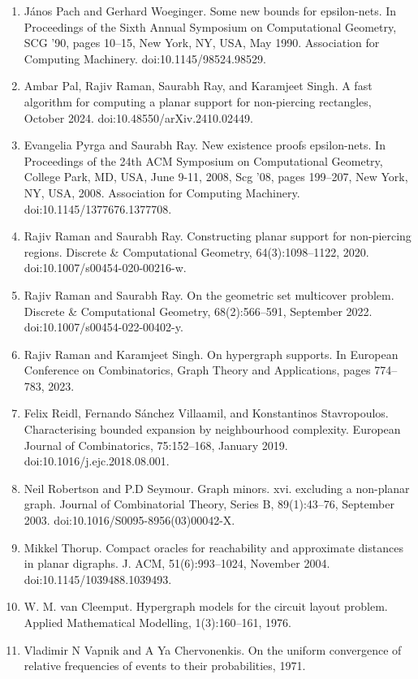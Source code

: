 \documentclass[10pt,a4paper]{article}
\begin{document}
\begin{enumerate}
\item[]  [51]  János Pach and Gerhard Woeginger.  Some new bounds for epsilon-nets.  In Proceedings of the Sixth Annual Symposium on Computational Geometry, SCG ’90, pages 10–15, New York, NY, USA, May 1990. Association for Computing Machinery.  doi:10.1145/98524.98529.  
\item[]  [52]  Ambar Pal, Rajiv Raman, Saurabh Ray, and Karamjeet Singh.  A fast algorithm for computing a planar support for non-piercing rectangles, October 2024.  doi:10.48550/arXiv.2410.02449.  
\item[]  [53]  Evangelia Pyrga and Saurabh Ray.  New existence proofs epsilon-nets.  In Proceedings of the 24th ACM Symposium on Computational Geometry, College Park, MD, USA, June 9-11, 2008, Scg ’08, pages 199–207, New York, NY, USA, 2008. Association for Computing Machinery.  doi:10.1145/1377676.1377708.  
\item[]  [54]  Rajiv Raman and Saurabh Ray.  Constructing planar support for non-piercing regions.  Discrete \& Computational Geometry, 64(3):1098–1122, 2020.  doi:10.1007/s00454-020-00216-w.  
\item[]  [55]  Rajiv Raman and Saurabh Ray.  On the geometric set multicover problem.  Discrete \& Computational Geometry, 68(2):566–591, September 2022.  doi:10.1007/s00454-022-00402-y.  
\item[]  [56]  Rajiv Raman and Karamjeet Singh.  On hypergraph supports.  In European Conference on Combinatorics, Graph Theory and Applications, pages 774–783, 2023.  
\item[]  [57]  Felix Reidl, Fernando Sánchez Villaamil, and Konstantinos Stavropoulos.  Characterising bounded expansion by neighbourhood complexity.  European Journal of Combinatorics, 75:152–168, January 2019.  doi:10.1016/j.ejc.2018.08.001.  
\item[]  [58]  Neil Robertson and P.D Seymour.  Graph minors. xvi. excluding a non-planar graph.  Journal of Combinatorial Theory, Series B, 89(1):43–76, September 2003.  doi:10.1016/S0095-8956(03)00042-X.  
\item[]  [59]  Mikkel Thorup.  Compact oracles for reachability and approximate distances in planar digraphs.  J. ACM, 51(6):993–1024, November 2004.  doi:10.1145/1039488.1039493.  
\item[]  [60]  W. M. van Cleemput.  Hypergraph models for the circuit layout problem.  Applied Mathematical Modelling, 1(3):160–161, 1976.  
\item[]  [61]  Vladimir N Vapnik and A Ya Chervonenkis.  On the uniform convergence of relative frequencies of events to their probabilities, 1971.  

\end{enumerate}
\end{document}
